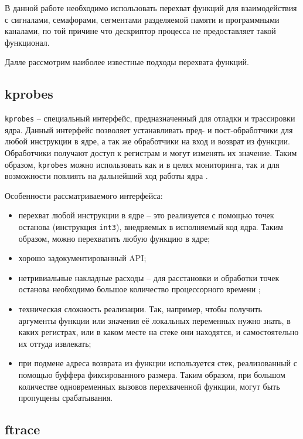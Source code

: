 В данной работе необходимо использовать перехват функций для взаимодействия с сигналами, семафорами, сегментами разделяемой памяти и программными каналами, по той причине что дескриптор процесса не предоставляет такой функционал.

Далле рассмотрим наиболее известные подходы перехвата функций.

\subsection{kprobes}

\texttt{kprobes} \cite{kprobes} -- специальный интерфейс, предназначенный для отладки и трассировки ядра. Данный интерфейс позволяет устанавливать пред- и пост-обработчики для любой инструкции в ядре, а так же обработчики на вход и возврат из функции. Обработчики получают доступ к регистрам и могут изменять их значение. Таким образом, \texttt{kprobes} можно использовать как и в целях мониторинга, так и для возможности повлиять на дальнейший ход работы ядра \cite{habr-profiling-linux}.

Особенности рассматриваемого интерфейса:

\begin{itemize}
	\item перехват любой инструкции в ядре -- это реализуется с помощью точек останова (инструкция \texttt{int3}), внедряемых в исполняемый код ядра. Таким образом, можно перехватить любую функцию в ядре;
	\item хорошо задокументированный API;
	\item нетривиальные накладные расходы -- для расстановки и обработки точек останова необходимо большое количество процессорного времени \cite{habr-profiling-linux};
	\item техническая сложность реализации. Так, например, чтобы получить аргументы функции или значения её локальных переменных нужно знать, в каких регистрах, или в каком месте на стеке они находятся, и самостоятельно их оттуда извлекать;
	\item при подмене адреса возврата из функции используется стек, реализованный с помощью буффера фиксированного размера. Таким образом, при большом количестве одновременных вызовов перехваченной функции, могут быть пропущены срабатывания.
\end{itemize}

\subsection{ftrace}

